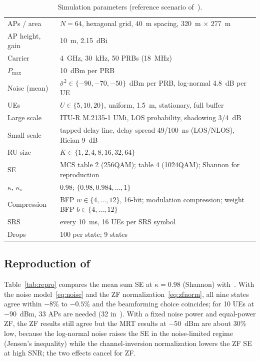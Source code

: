 \documentclass[10pt, final, journal, letterpaper, twocolumn]{IEEEtran}
\begin{document}
\begin{table}[t]
\centering
\caption{Simulation parameters (reference scenario of~\cite{girycki2024eucnc}).}
\label{tab:params}
\footnotesize
\begin{tabular}{@{}lp{}@{}}
\toprule
APs / area & $N=64$, hexagonal grid, 40~m spacing, 320~m $\times$ 277~m \\
AP height, gain & 10~m, 2.15~dBi \\
Carrier & 4~GHz, 30~kHz, 50 PRBs (18~MHz) \\
$P_{\max}$ & 10~dBm per PRB \\
Noise (mean) & $\bar\sigma^2\in\{-90,-70,-50\}$~dBm per PRB, log-normal 4.8~dB per UE \\
UEs & $U\in\{5,10,20\}$, uniform, 1.5~m, stationary, full buffer \\
Large scale & ITU-R M.2135-1 UMi, LOS probability, shadowing 3/4~dB \\
Small scale & tapped delay line, delay spread 49/100~ns (LOS/NLOS), Rician 9~dB \\
RU size & $K\in\{1,2,4,8,16,32,64\}$ \\
SE & MCS table 2 (256QAM); table 4 (1024QAM); Shannon for reproduction \\
$\kappa$, $\kappa_s$ & 0.98; $\{0.98,0.984,\dots,1\}$ \\
Compression & BFP $w\in\{4,\dots,12\}$, 16-bit; modulation compression; weight BFP $b\in\{4,\dots,12\}$ \\
SRS & every 10~ms, 16 UEs per SRS symbol \\
Drops & 100 per state; 9 states \\
\bottomrule
\end{tabular}
\end{table}

\subsection{Reproduction of~\cite{girycki2024eucnc}}
\label{subsec:repro}

Table~\ref{tab:repro} compares the mean sum SE at $\kappa=0.98$ (Shannon) with~\cite[Fig.~5]{girycki2024eucnc}. With the noise model~\eqref{eq:noise} and the ZF normalization~\eqref{eq:zfnorm}, all nine states agree within $-8\%$ to $-0.5\%$ and the beamforming choice coincides; for 10 UEs at $-90$~dBm, 33 APs are needed (32 in~\cite{girycki2024eucnc}). With a fixed noise power and equal-power ZF, the ZF results still agree but the MRT results at $-50$~dBm are about 30\% low, because the log-normal noise raises the SE in the noise-limited regime (Jensen's inequality) while the channel-inversion normalization lowers the ZF SE at high SNR; the two effects cancel for ZF.
\end{document}
